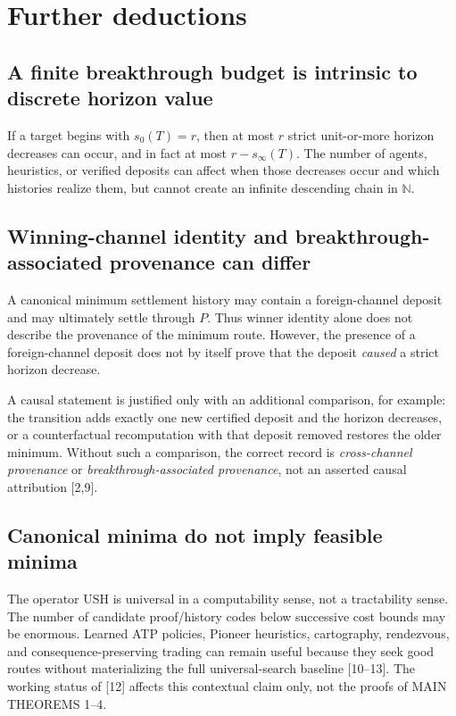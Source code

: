 \documentclass[11pt]{article}
\theoremstyle{definition}
\newcommand{\USH}{\ensuremath{\mathrm{USH}}}
\begin{document}
\section{Further deductions}
\subsection{A finite breakthrough budget is intrinsic to discrete horizon value}
If a target begins with $s_0(T)=r$, then at most $r$ strict unit-or-more horizon decreases can occur, and in fact at most $r-s_\infty(T)$. The number of agents, heuristics, or verified deposits can affect when those decreases occur and which histories realize them, but cannot create an infinite descending chain in $\mathbb N$.

\subsection{Winning-channel identity and breakthrough-associated provenance can differ}
A canonical minimum settlement history may contain a foreign-channel deposit and may ultimately settle through $P$. Thus winner identity alone does not describe the provenance of the minimum route. However, the presence of a foreign-channel deposit does not by itself prove that the deposit \emph{caused} a strict horizon decrease.

A causal statement is justified only with an additional comparison, for example: the transition adds exactly one new certified deposit and the horizon decreases, or a counterfactual recomputation with that deposit removed restores the older minimum. Without such a comparison, the correct record is \emph{cross-channel provenance} or \emph{breakthrough-associated provenance}, not an asserted causal attribution [2,9].

\subsection{Canonical minima do not imply feasible minima}
The operator $\USH$ is universal in a computability sense, not a tractability sense. The number of candidate proof/history codes below successive cost bounds may be enormous. Learned ATP policies, Pioneer heuristics, cartography, rendezvous, and consequence-preserving trading can remain useful because they seek good routes without materializing the full universal-search baseline [10--13]. The working status of [12] affects this contextual claim only, not the proofs of MAIN THEOREMS 1--4.
\end{document}
